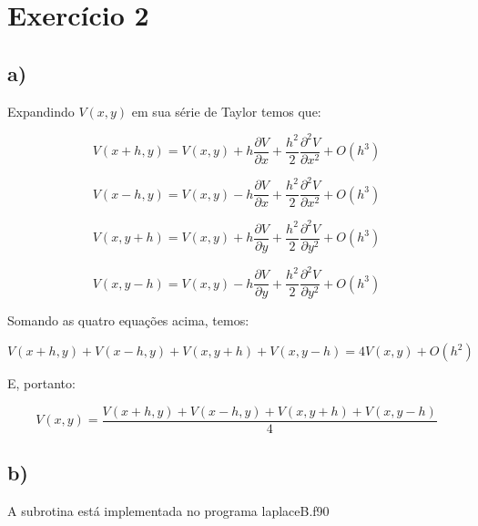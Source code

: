 \documentclass[a4wide]{report}
\begin{document}
\section*{Exercício 2}

\subsection*{a)}

Expandindo $V(x,y)$ em sua série de Taylor temos que:


\begin{equation}
V(x + h,y) = V(x,y) + h \frac{\partial V}{\partial x} + \frac{h^2}{2} \frac{\partial^2 V}{\partial x^2} + O(h^3) 
\end{equation}

\begin{equation}
V(x - h,y) = V(x,y) - h \frac{\partial V}{\partial x} + \frac{h^2}{2} \frac{\partial^2 V}{\partial x^2} + O(h^3) 
\end{equation}

\begin{equation}
V(x,y+h) = V(x,y) + h \frac{\partial V}{\partial y} + \frac{h^2}{2} \frac{\partial^2 V}{\partial y^2} + O(h^3) 
\end{equation}

\begin{equation}
V(x,y-h) = V(x,y) - h \frac{\partial V}{\partial y} + \frac{h^2}{2} \frac{\partial^2 V}{\partial y^2} + O(h^3) 
\end{equation}

Somando as quatro equações acima, temos:

\begin{equation*}
V(x + h,y) + V(x-h,y) + V(x,y+h) + V(x,y-h) = 4 V(x,y) + O(h^2) 
\end{equation*}

E, portanto:

\begin{equation}
 V(x,y) = \frac{ V(x + h,y) + V(x-h,y) + V(x,y+h) + V(x,y-h)}{4}
\end{equation}


\subsection*{b)}
A subrotina está implementada no programa laplaceB.f90 
\end{document}
